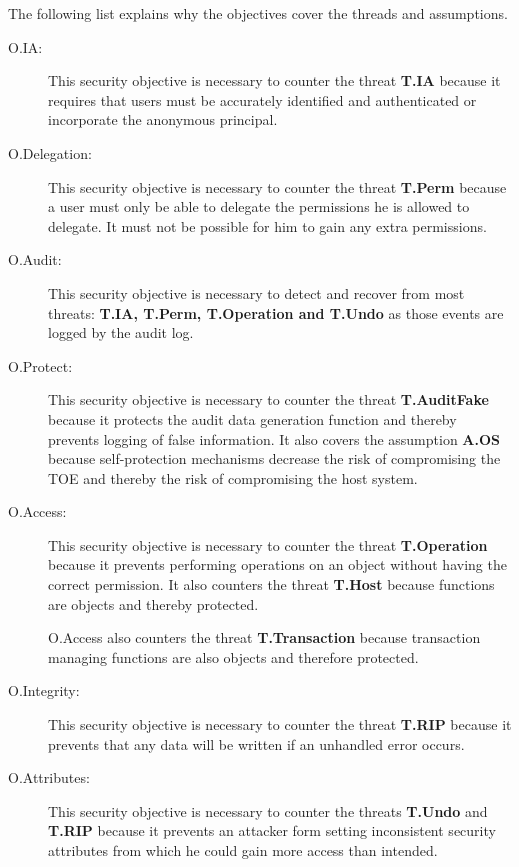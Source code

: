 \documentclass[12pt,english]{scrbook}
\begin{document}
The following list explains why the objectives cover
the threads and assumptions.

\begin{description}
  
  \item[O.IA:] This security objective is necessary to counter the threat
  \textbf{T.IA} because it requires that users must be accurately identified
  and authenticated or incorporate the anonymous principal.

  \item[O.Delegation:] This security objective is necessary to counter the
  threat \textbf{T.Perm} because a user must only be able to delegate the permissions
  he is allowed to delegate. It must not be possible for him to gain any extra
  permissions.
  
  \item[O.Audit:] This security objective is necessary to detect and recover
  from most threats: \textbf{T.IA, T.Perm, T.Operation and T.Undo}
  as those events are logged by the audit log.
  
  \item[O.Protect:] This security objective is necessary to counter the threat
  \textbf{T.AuditFake} because it protects the audit data generation function
  and thereby prevents logging of false information. It also covers the
  assumption \textbf{A.OS} because self-protection mechanisms decrease the
  risk of compromising the TOE and thereby the risk of compromising the
  host system.
  
  \item[O.Access:] This security objective is necessary to counter the threat
  \textbf{T.Operation} because it prevents performing operations on an object
  without having the correct permission. It also counters the threat
  \textbf{T.Host} because functions are objects and thereby protected.

  O.Access also counters the threat \textbf{T.Transaction} because transaction
  managing functions are also objects and therefore protected.

  \item[O.Integrity:] This security objective is necessary to counter the
  threat \textbf{T.RIP} because it prevents that any data will be written if
  an unhandled error occurs.
  
  \item[O.Attributes:] This security objective is necessary to counter the
  threats \textbf{T.Undo} and \textbf{T.RIP} because it
  prevents an attacker form setting inconsistent security attributes from
  which he could gain more access than intended.


\end{description}
\end{document}
